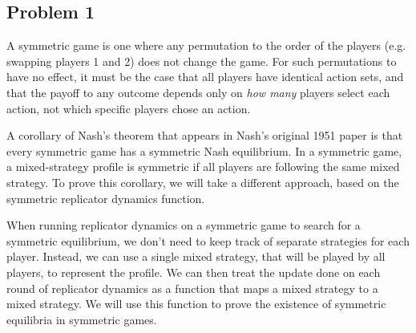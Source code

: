 \documentclass[11pt]{article}
\newcommand{\titlebox}[4]{
    \begin{center}
        \framebox{
            \vbox{
            \hbox to \textwidth { #1 \hfill #3}
            \vspace{-4mm}
            \hbox to \textwidth {\hfill \Large \bf #2 \hfill}
            \hbox to \textwidth { {\it \hfill Due #4 \hfill} }
        }
    }
    \end{center}
}
\begin{document}
\titlebox{CSC 383}
{Homework 5}
{Zach Nussbaum and Aidan O'Neill} %
{April 3\textsuperscript{rd}, 2020}



\subsection*{Problem 1}

A symmetric game is one where any permutation to the order of the players (e.g. swapping players 1 and 2) does not change the game.
For such permutations to have no effect, it must be the case that all players have identical action sets, and that the payoff to any outcome depends only on \emph{how many} players select each action, not which specific players chose an action.

A corollary of Nash's theorem that appears in Nash's original 1951 paper is that every symmetric game has a symmetric Nash equilibrium.
In a symmetric game, a mixed-strategy profile is symmetric if all players are following the same mixed strategy.
To prove this corollary, we will take a different approach, based on the symmetric replicator dynamics function.

When running replicator dynamics on a symmetric game to search for a symmetric equilibrium, we don't need to keep track of separate strategies for each player.
Instead, we can use a single mixed strategy, that will be played by all players, to represent the profile.
We can then treat the update done on each round of replicator dynamics as a function that maps a mixed strategy to a mixed strategy.
We will use this function to prove the existence of symmetric equilibria in symmetric games.
\end{document}
